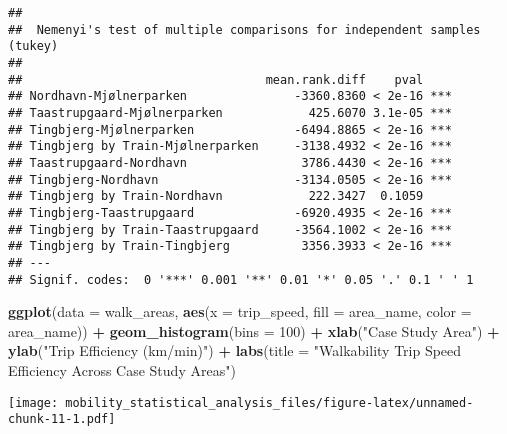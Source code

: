 \documentclass[
]{article}
\newenvironment{Shaded}{\begin{snugshade}}{\end{snugshade}}
\newcommand{\AttributeTok}[1]{\textcolor[rgb]{0.13,0.29,0.53}{#1}}
\newcommand{\DecValTok}[1]{\textcolor[rgb]{0.00,0.00,0.81}{#1}}
\newcommand{\FunctionTok}[1]{\textcolor[rgb]{0.13,0.29,0.53}{\textbf{#1}}}
\newcommand{\NormalTok}[1]{#1}
\newcommand{\SpecialCharTok}[1]{\textcolor[rgb]{0.81,0.36,0.00}{\textbf{#1}}}
\newcommand{\StringTok}[1]{\textcolor[rgb]{0.31,0.60,0.02}{#1}}
\begin{document}
\begin{Shaded}
\end{Shaded}

\begin{verbatim}
## 
##  Nemenyi's test of multiple comparisons for independent samples (tukey)  
## 
##                                  mean.rank.diff    pval    
## Nordhavn-Mjølnerparken               -3360.8360 < 2e-16 ***
## Taastrupgaard-Mjølnerparken            425.6070 3.1e-05 ***
## Tingbjerg-Mjølnerparken              -6494.8865 < 2e-16 ***
## Tingbjerg by Train-Mjølnerparken     -3138.4932 < 2e-16 ***
## Taastrupgaard-Nordhavn                3786.4430 < 2e-16 ***
## Tingbjerg-Nordhavn                   -3134.0505 < 2e-16 ***
## Tingbjerg by Train-Nordhavn            222.3427  0.1059    
## Tingbjerg-Taastrupgaard              -6920.4935 < 2e-16 ***
## Tingbjerg by Train-Taastrupgaard     -3564.1002 < 2e-16 ***
## Tingbjerg by Train-Tingbjerg          3356.3933 < 2e-16 ***
## ---
## Signif. codes:  0 '***' 0.001 '**' 0.01 '*' 0.05 '.' 0.1 ' ' 1
\end{verbatim}

\begin{Shaded}
\begin{Highlighting}[]
\FunctionTok{ggplot}\NormalTok{(}\AttributeTok{data =}\NormalTok{ walk\_areas, }\FunctionTok{aes}\NormalTok{(}\AttributeTok{x =}\NormalTok{ trip\_speed, }\AttributeTok{fill =}\NormalTok{ area\_name, }\AttributeTok{color =}\NormalTok{ area\_name)) }\SpecialCharTok{+} 
  \FunctionTok{geom\_histogram}\NormalTok{(}\AttributeTok{bins =} \DecValTok{100}\NormalTok{) }\SpecialCharTok{+} 
  \FunctionTok{xlab}\NormalTok{(}\StringTok{"Case Study Area"}\NormalTok{) }\SpecialCharTok{+} 
  \FunctionTok{ylab}\NormalTok{(}\StringTok{"Trip Efficiency (km/min)"}\NormalTok{) }\SpecialCharTok{+} 
  \FunctionTok{labs}\NormalTok{(}\AttributeTok{title =} \StringTok{"Walkability Trip Speed Efficiency Across Case Study Areas"}\NormalTok{) }
\end{Highlighting}
\end{Shaded}

\texttt{[image: mobility\_statistical\_analysis\_files/figure-latex/unnamed-chunk-11-1.pdf]}
\end{document}
